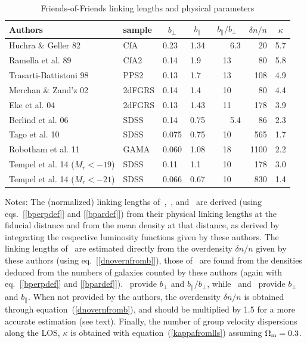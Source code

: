 \begin{table}
\caption{Friends-of-Friends linking lengths and physical parameters}
\begin{center}
\setlength{\tabcolsep}{2.5pt}
\begin{tabular}{llllcrl}
\toprule%
\toprule%
Authors & sample & \multicolumn{1}{c}{$b_\perp$} & \multicolumn{1}{c}{$b_\parallel$} &
\multicolumn{1}{c}{$b_\parallel/b_\perp$} & $\delta n/
n$ & \multicolumn{1}{c}{$\kappa$} \\
\toprule%
Huchra \& Geller 82     & CfA     & 0.23  & 1.34  & \ \ \ \ 6.3  & 20    & 5.7 \\
Ramella et al. 89       & CfA2    & 0.14  & 1.9   & 13   & 80    & 5.8 \\
Trasarti-Battistoni 98  & PPS2    & 0.13  & 1.7   & 13   & 108   & 4.9\\
Merchan \& Zand'z 02    & 2dFGRS  & 0.14  & 1.4   & 10   & 80    & 4.4 \\
Eke et al. 04           & 2dFGRS  & 0.13  & 1.43  & 11   & 178   & 3.9\\
Berlind et al. 06       & SDSS    & 0.14  & 0.75  & \ \ \ \ 5.4  & 86    & 2.3 \\
Tago et al. 10          & SDSS    & 0.075  & 0.75  & 10   & 565  & 1.7\\
Robotham et al. 11      & GAMA    & 0.060  & 1.08  & 18   & 1100  & 2.2\\
Tempel et al. 14 ($M_r<-19$)        & SDSS    & 0.11  & 1.1 & 10 & 178 & 3.0 \\
Tempel et al. 14 ($M_r<-21$)        & SDSS    & 0.066  & 0.67 & 10 & 830 & 1.4
\\
\bottomrule%
\end{tabular}
\end{center}
\parbox{\hsize}{%
Notes: The (normalized) linking lengths of~\cite{HG82},~\cite{RGH89},
and~\cite{TrasartiBattistoni98} are derived (using eqs.~[\ref{bperpdef}] and
[\ref{bpardef}]) from their physical linking lengths at the fiducial distance
and from the mean density at that distance, as derived by integrating the
respective luminosity functions given by these authors. The linking lengths
of~\cite{MZ02} are estimated directly from the overdensity $\delta n/n$ given
by these authors (using eq.~[\ref{dnovernfromb}]), those of~\cite{Tago+10} are
found from the densities deduced from the numbers of galaxies counted by these
authors (again with eq.~[\ref{bperpdef}] and [\ref{bpardef}]).~\cite{Eke+04}
provide $b_\perp$ and $b_\parallel/b_\perp$, while~\cite{Berlind+06}
and~\cite{Tempel+14} provide $b_\perp$ and $b_\parallel$. When not provided by
the authors, the overdensity $\delta n/n$ is obtained through
equation~(\ref{dnovernfromb}), and should be multiplied by 1.5 for a more
accurate estimation (see text). Finally, the number of group velocity
dispersions along the LOS, $\kappa$ is obtained with
equation~(\ref{kappafromlls}) assuming $\Omega_{\rm m}=0.3$.
}
\label{tab:groupalgos}
\end{table}

